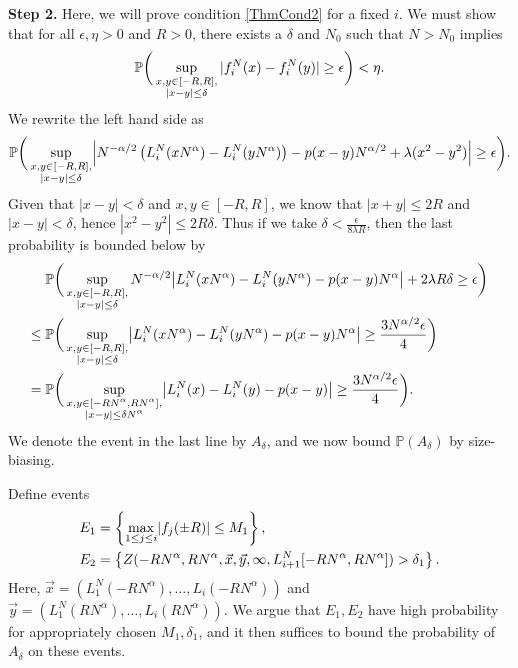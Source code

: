 	\noindent\textbf{Step 2.} Here, we will prove condition \eqref{ThmCond2} for a fixed $i$. We must show that for all $\epsilon,\eta>0$ and $R>0$, there exists a $\delta$ and $N_0$ such that $N>N_0$ implies 
	\[
	\mathbb{P}\bigg(\sup_{\substack{x,y\in [-R,R],\\ |x-y|\leq\delta}} |f^N_i(x) - f^N_i(y)| \geq \epsilon\bigg)<\eta.
	\]
	We rewrite the left hand side as
	\begin{align}
	\pr\bigg(\sup_{\substack{x,y\in [-R,R],\\ |x-y|\leq\delta}} \abs*{N^{-\alpha/2}\left(L^N_i(xN^{\alpha}) - L^N_i(yN^\alpha)\right)-p(x-y)N^{\alpha/2}+\lambda(x^2-y^2)} \geq \epsilon\bigg).
	\end{align}
	Given that $|x-y|<\delta$ and $x,y\in [-R,R]$, we know that $|x+y|\leq 2R$ and $|x-y|<\delta$, hence $|x^2-y^2|\leq 2R\delta$. Thus if we take $\delta < \frac{\epsilon}{8\lambda R}$, then the last probability is bounded below by
	\begin{align*}
	&\pr\bigg(\sup_{\substack{x,y\in [-R,R],\\ |x-y|\leq\delta}} N^{-\alpha/2}\abs*{L_i^N(xN^\alpha)-L_i^N(yN^\alpha)-p(x-y)N^\alpha}+2\lambda R\delta\geq \epsilon\bigg)\\
	\leq \; & \pr\bigg(\sup_{\substack{x,y\in [-R,R],\\ |x-y|\leq\delta}} \abs*{L_i^N(xN^\alpha)-L_i^N(yN^\alpha)-p(x-y)N^\alpha}\geq \frac{3N^{\alpha/2}\epsilon}4\bigg)\\
	= \; & \pr\bigg(\sup_{\substack{x,y\in [-RN^\alpha,RN^\alpha],\\ |x-y|\leq \delta N^\alpha}} \abs*{L_i^N(x)-L_i^N(y)-p(x-y)}\geq \frac{3N^{\alpha/2}\epsilon}4\bigg).
	\end{align*}
	We denote the event in the last line by $A_\delta$, and we now bound $\mathbb{P}(A_\delta)$ by size-biasing.
	
	Define events
	\begin{align*}
	E_1&=\left\{\max_{1\leq j \leq i}\abs*{f_j(\pm R)}\leq M_1\right\},\\
	E_2&=\left\{Z(-RN^\alpha, RN^\alpha, \vec x, \vec y, \infty, L_{i+1}^N[-RN^\alpha, RN^\alpha])>\delta_1\right\}.
	\end{align*}
	Here, $\vec{x} = (L_1^N(-RN^\alpha),\dots,L_i(-RN^\alpha))$ and $\vec{y} = (L_1^N(RN^\alpha),\dots,L_i(RN^\alpha))$. We argue that $E_1,E_2$ have high probability for appropriately chosen $M_1,\delta_1$, and it then suffices to bound the probability of $A_\delta$ on these events.
	
